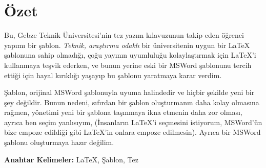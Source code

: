 \chapter*{Özet}

Bu, Gebze Teknik Üniversitesi'nin tez yazım kılavuzunun \cite{gtustyle} takip eden öğrenci yapımı bir şablon. \emph{Teknik, araştırma odaklı} bir üniversitenin uygun bir \LaTeX~ şablonuna sahip olmadığı, çoğu yayının uyumluluğu kolaylaştırmak için \LaTeX'i kullanmaya teşvik ederken, ve bunun yerine eski bir MSWord şablonunu tercih ettiği için hayal kırıklığı yaşayıp bu şablonu yaratmaya karar verdim.

Şablon, orijinal MSWord şablonuyla uyuma halindedir ve hiçbir şekilde yeni bir şey değildir. Bunun nedeni, sıfırdan bir şablon oluşturmanın daha kolay olmasına rağmen, yönetimi yeni bir şablona taşınmaya ikna etmenin daha zor olması, ayrıca ben seçim yanlısıyım, (İnsanların \LaTeX'i seçmesini istiyorum, MSWord'ün bize empoze edildiği gibi \LaTeX'in onlara empoze edilmesin). Ayrıca bir MSWord şablonu oluşturmaya hazır değilim.

\vfill
\textbf{Anahtar Kelimeler:} \LaTeX, Şablon, Tez
\clearpage